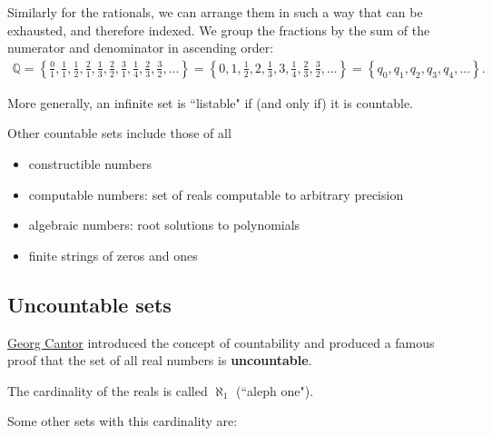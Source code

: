 \documentclass{article}[12pt]
\newcommand{\Q}{\mathbb{Q}}
\begin{document}
            Similarly for the rationals, we can arrange them in such a way that can be exhausted, and therefore indexed. We group the fractions by the sum of the numerator and denominator in ascending order:
            \begin{align}
                \Q = \left\{\frac{0}{1}, \frac{1}{1}, \frac{1}{2}, \frac{2}{1}, \frac{1}{3}, \frac{2}{2}, \frac{3}{1}, \frac{1}{4}, \frac{2}{3}, \frac{3}{2}, ... \right\}
                = \left\{0, 1, \frac{1}{2}, 2, \frac{1}{3}, 3, \frac{1}{4}, \frac{2}{3}, \frac{3}{2}, ... \right\}
                = \left\{q_0, q_1, q_2, q_3, q_4, ... \right\}.
            \end{align}
        
            More generally, an infinite set is ``listable" if (and only if) it is countable.
            
            Other countable sets include those of all
            \begin{itemize}
                \item
                constructible numbers
                
                \item
                computable numbers: set of reals computable to arbitrary precision
                
                \item
                algebraic numbers: root solutions to polynomials
                
                \item
                finite strings of zeros and ones
                
            \end{itemize}
                
            
            
        \subsection{Uncountable sets}
            \href{https://www.youtube.com/watch?v=elvOZm0d4H0}{Georg Cantor} introduced the concept of countability and produced a famous proof that the set of all real numbers is \textbf{uncountable}.
            
            The cardinality of the reals is called $\aleph_1$ (``aleph one").
            
            Some other sets with this cardinality are:
            
\end{document}
